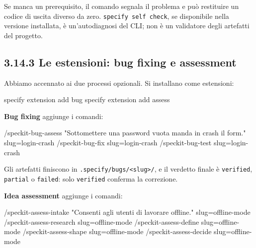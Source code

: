 \documentclass[
  italian,
  10pt,
]{book}
\newenvironment{Shaded}{\begin{snugshade}}{\end{snugshade}}
\newcommand{\ExtensionTok}[1]{#1}
\newcommand{\NormalTok}[1]{#1}
\begin{document}
Se manca un prerequisito, il comando segnala il problema e può
restituire un codice di uscita diverso da zero.
\texttt{specify\ self\ check}, se disponibile nella versione installata,
è un'autodiagnosi del CLI; non è un validatore degli artefatti del
progetto.

\subsection{3.14.3 Le estensioni: bug fixing e
assessment}\label{le-estensioni-bug-fixing-e-assessment}

Abbiamo accennato ai due processi opzionali. Si installano come
estensioni:

\begin{Shaded}
\begin{Highlighting}[]
\ExtensionTok{specify}\NormalTok{ extension add bug}
\ExtensionTok{specify}\NormalTok{ extension add assess}
\end{Highlighting}
\end{Shaded}

\textbf{Bug fixing} aggiunge i comandi:

\begin{Shaded}
\begin{Highlighting}[]
\NormalTok{/speckit{-}bug{-}assess "Sottomettere una password vuota manda in crash il form." slug=login{-}crash}
\NormalTok{/speckit{-}bug{-}fix slug=login{-}crash}
\NormalTok{/speckit{-}bug{-}test slug=login{-}crash}
\end{Highlighting}
\end{Shaded}

Gli artefatti finiscono in
\texttt{.specify/bugs/\textless{}slug\textgreater{}/}, e il verdetto
finale è \texttt{verified}, \texttt{partial} o \texttt{failed}: solo
\texttt{verified} conferma la correzione.

\textbf{Idea assessment} aggiunge i comandi:

\begin{Shaded}
\begin{Highlighting}[]
\NormalTok{/speckit{-}assess{-}intake "Consenti agli utenti di lavorare offline." slug=offline{-}mode}
\NormalTok{/speckit{-}assess{-}research slug=offline{-}mode}
\NormalTok{/speckit{-}assess{-}define slug=offline{-}mode}
\NormalTok{/speckit{-}assess{-}shape slug=offline{-}mode}
\NormalTok{/speckit{-}assess{-}decide slug=offline{-}mode}
\end{Highlighting}
\end{Shaded}
\end{document}
